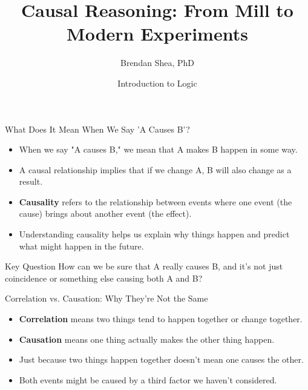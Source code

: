 \documentclass{beamer}
\title{Causal Reasoning: From Mill to Modern Experiments}
\author{Brendan Shea, PhD}
\date{Introduction to Logic}
\begin{document}
\begin{frame}
    \titlepage
\end{frame}

\begin{frame}{What Does It Mean When We Say 'A Causes B'?}
    \begin{itemize}
        \item When we say "A causes B," we mean that A makes B happen in some way.
        \item A causal relationship implies that if we change A, B will also change as a result.
        \item \textbf{Causality} refers to the relationship between events where one event (the cause) brings about another event (the effect).
        \item Understanding causality helps us explain why things happen and predict what might happen in the future.
    \end{itemize}
    
    \begin{block}{Key Question}
        How can we be sure that A really causes B, and it's not just coincidence or something else causing both A and B?
    \end{block}
\end{frame}

\begin{frame}{Correlation vs. Causation: Why They're Not the Same}
    \begin{itemize}
        \item \textbf{Correlation} means two things tend to happen together or change together.
        \item \textbf{Causation} means one thing actually makes the other thing happen.
        \item Just because two things happen together doesn't mean one causes the other.
        \item Both events might be caused by a third factor we haven't considered.
    \end{itemize}
    
    \begin{center}
    \end{center}
\end{frame}
\end{document}
